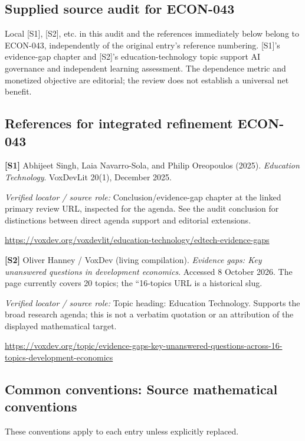\documentclass[11pt,a4paper]{article}
\begin{document}
\subsection*{Supplied source audit for ECON-043}
Local [S1], [S2], etc. in this audit and the references immediately below
belong to ECON-043, independently of the original entry's reference numbering.
[S1]'s evidence-gap chapter and [S2]'s education-technology topic support AI governance and independent learning assessment. The dependence metric and monetized objective are editorial; the review does not establish a universal net benefit.
\subsection*{References for integrated refinement ECON-043}
{\footnotesize\raggedright
\par\noindent\textbf{[S1]} Abhijeet Singh, Laia Navarro-Sola, and Philip Oreopoulos (2025). \emph{Education Technology}. VoxDevLit 20(1), December 2025.\par \textit{Verified locator / source role:} Conclusion/evidence-gap chapter at the linked primary review URL, inspected for the agenda. See the audit conclusion for distinctions between direct agenda support and editorial extensions.\par \url{https://voxdev.org/voxdevlit/education-technology/edtech-evidence-gaps}\par\smallskip
\par\noindent\textbf{[S2]} Oliver Hanney / VoxDev (living compilation). \emph{Evidence gaps: Key unanswered questions in development economics}. Accessed 8 October 2026. The page currently covers 20 topics; the ``16-topics URL is a historical slug.\par \textit{Verified locator / source role:} Topic heading: Education Technology. Supports the broad research agenda; this is not a verbatim quotation or an attribution of the displayed mathematical target.\par \url{https://voxdev.org/topic/evidence-gaps-key-unanswered-questions-across-16-topics-development-economics}\par\smallskip
}

\subsection*{Common conventions: Source mathematical conventions}

These conventions apply to each entry unless explicitly replaced.
\end{document}
